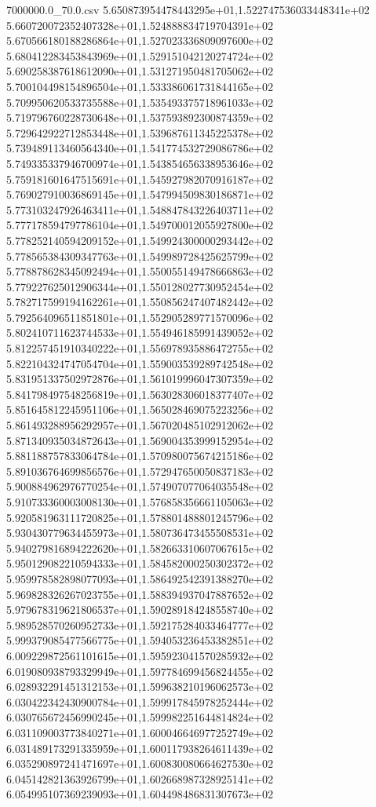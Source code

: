 \begin{filecontents*}{7000000.0_70.0.csv}
5.650873954478443295e+01,1.522747536033448341e+02
5.660720072352407328e+01,1.524888834719704391e+02
5.670566180188286864e+01,1.527023336809097600e+02
5.680412283453843969e+01,1.529151042120274724e+02
5.690258387618612090e+01,1.531271950481705062e+02
5.700104498154896504e+01,1.533386061731844165e+02
5.709950620533735588e+01,1.535493375718961033e+02
5.719796760228730648e+01,1.537593892300874359e+02
5.729642922712853448e+01,1.539687611345225378e+02
5.739489113460564340e+01,1.541774532729086786e+02
5.749335337946700974e+01,1.543854656338953646e+02
5.759181601647515691e+01,1.545927982070916187e+02
5.769027910036869145e+01,1.547994509830186871e+02
5.773103247926463411e+01,1.548847843226403711e+02
5.777178594797786104e+01,1.549700012055927800e+02
5.778252140594209152e+01,1.549924300000293442e+02
5.778565384309347763e+01,1.549989728425625799e+02
5.778878628345092494e+01,1.550055149478666863e+02
5.779227625012906344e+01,1.550128027730952454e+02
5.782717599194162261e+01,1.550856247407482442e+02
5.792564096511851801e+01,1.552905289771570096e+02
5.802410711623744533e+01,1.554946185991439052e+02
5.812257451910340222e+01,1.556978935886472755e+02
5.822104324747054704e+01,1.559003539289742548e+02
5.831951337502972876e+01,1.561019996047307359e+02
5.841798497548256819e+01,1.563028306018377407e+02
5.851645812245951106e+01,1.565028469075223256e+02
5.861493288956292957e+01,1.567020485102912062e+02
5.871340935034872643e+01,1.569004353999152954e+02
5.881188757833064784e+01,1.570980075674215186e+02
5.891036764699856576e+01,1.572947650050837183e+02
5.900884962976770254e+01,1.574907077064035548e+02
5.910733360003008130e+01,1.576858356661105063e+02
5.920581963111720825e+01,1.578801488801245796e+02
5.930430779634455973e+01,1.580736473455508531e+02
5.940279816894222620e+01,1.582663310607067615e+02
5.950129082210594333e+01,1.584582000250302372e+02
5.959978582898077093e+01,1.586492542391388270e+02
5.969828326267023755e+01,1.588394937047887652e+02
5.979678319621806537e+01,1.590289184248558740e+02
5.989528570260952733e+01,1.592175284033464777e+02
5.999379085477566775e+01,1.594053236453382851e+02
6.009229872561101615e+01,1.595923041570285932e+02
6.019080938793329949e+01,1.597784699456824455e+02
6.028932291451312153e+01,1.599638210196062573e+02
6.030422342430900784e+01,1.599917845978252444e+02
6.030765672456990245e+01,1.599982251644814824e+02
6.031109003773840271e+01,1.600046646977252749e+02
6.031489173291335959e+01,1.600117938264611439e+02
6.035290897241471697e+01,1.600830080664627530e+02
6.045142821363926799e+01,1.602668987328925141e+02
6.054995107369239093e+01,1.604498486831307673e+02

\end{filecontents*}
